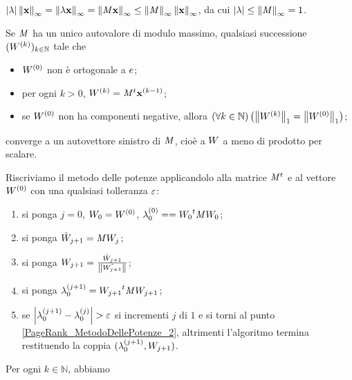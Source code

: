 $\AbsoluteValue{\Eigenvalue}\Norm{\Eigenvector}[\infty]
= \Norm{\Eigenvalue\Eigenvector}[\infty]
= \Norm{\Matrix\Eigenvector}[\infty]
\leq \Norm{\Matrix}[\infty]\Norm{\Eigenvector}[\infty]$,
da cui
$\AbsoluteValue{\Eigenvalue}
\leq \Norm{\Matrix}[\infty] = 1$. \EndProof
\begin{Theorem}
  Se $\mathit{M}$ ha un unico autovalore di modulo massimo, qualsiasi successione
  $(W^{(k)})_{k \in \mathbb{N}}$ tale che
  \begin{itemize}
    \item $W^{(0)}$ non \`e ortogonale a $e$;
    \item per ogni $k > 0$,
      $\Weights^{(k)} = \Transposed{\Matrix}\Eigenvector^{(k - 1)}$;
    \item se $W^{(0)}$ non ha componenti negative, allora
      $\ForAll{k \in \mathbb{N}}{
      \Norm{\Weights^{(k)}}[1] = \Norm{\Weights^{(0)}}[1]}$;
  \end{itemize}
  converge a un autovettore sinistro di $\mathit{M}$, cio\`e a $W$
  a meno di prodotto per scalare.
\end{Theorem}
\Proof Riscriviamo il metodo delle potenze applicandolo alla matrice
${\mathit{M}}^t$ e al vettore $W^{(0)}$ con una qualsiasi
tolleranza $\varepsilon$:
\begin{enumerate}
  \item\label{PageRank_MetodoDellePotenze_1} si ponga $j = 0$,
    $W_0 = W^{(0)}$,
    $\lambda_0^{(0)} =
    = {W_0}^t\mathit{M}W_{0}$;
  \item\label{PageRank_MetodoDellePotenze_2} si ponga
    $\tilde{W}_{j + 1} = \mathit{M} W_j$;
  \item\label{PageRank_MetodoDellePotenze_3} si ponga
    $\Weights_{j + 1}
    = \frac{\tilde{\Weights}_{j + 1}}{\Norm{\tilde{\Weights_{j + 1}}}}$;
  \item\label{PageRank_MetodoDellePotenze_4} si ponga $\lambda_0^{(j + 1)}
    = {W_{j + 1}}^t\mathit{M}W_{j + 1}$;
  \item\label{PageRank_MetodoDellePotenze_5} se
    $\left \lvert \lambda_0^{(j + 1)} - \lambda_0^{(j)} \right \rvert
    > \varepsilon$
    si incrementi $j$ di $1$ e si torni al punto
    \ref{PageRank_MetodoDellePotenze_2}, altrimenti l'algoritmo termina
    restituendo la coppia $(\lambda_0^{(j + 1)},W_{j + 1})$.
\end{enumerate}
\par Per ogni $k \in \mathbb{N}$, abbiamo
